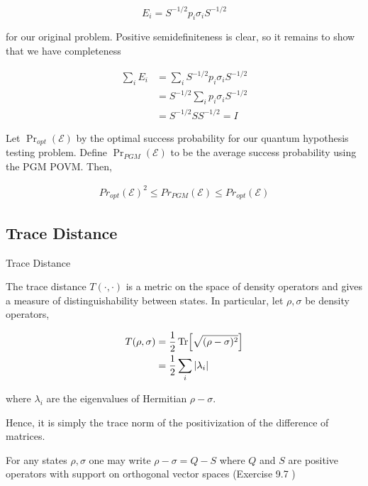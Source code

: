\documentclass[main.tex]{subfiles}
\begin{document}
\begin{subappendices}
$$E_i = S^{-1/2}p_i \sigma_i S^{-1/2}$$ 

for our original problem. Positive semidefiniteness is clear, so it remains to show that we have completeness

\begin{align*}
\sum_i E_i &= \sum_i S^{-1/2}p_i \sigma_i S^{-1/2}\\
&=  S^{-1/2} \sum_i p_i \sigma_i S^{-1/2} \\
&= S^{-1/2} S S^{-1/2} = I
\end{align*}

\begin{theorem}
Let $\Pr_{opt}(\mathcal{E})$ by the optimal success probability for our 	quantum hypothesis testing problem. Define $\Pr_{PGM}(\mathcal{E})$ to be the average success probability using the PGM POVM. Then,

\begin{align*}
Pr_{opt}(\mathcal{E})^2 \leq Pr_{PGM}(\mathcal{E}) \leq 	Pr_{opt}(\mathcal{E})
\end{align*}

\end{theorem}

\subsection{Trace Distance}

\begin{definition}
Trace Distance

The trace distance $T(\cdot , \cdot)$ is a metric on the space of density operators and gives a measure of distinguishability between states. In particular, let $\rho, \sigma$ be density operators,

\begin{align*}
	T(\rho, \sigma) &= \frac{1}{2} \Tr [\sqrt{(\rho - \sigma)^2}] \\
	&= \frac{1}{2} \sum_i |\lambda_i|
\end{align*}

where $\lambda_i$ are the eigenvalues of Hermitian $\rho - \sigma$.

Hence, it is simply the trace norm of the positivization of the difference of matrices.

\end{definition}

\begin{lemma}
For any states $\rho, \sigma$ one may write $\rho - \sigma = Q - S$ where $Q$ and $S$ are positive operators with support on orthogonal vector spaces	(Exercise 9.7 \cite{nielsen2010quantum})
\end{lemma}


\end{subappendices}
\end{document}
